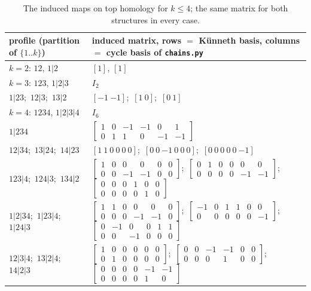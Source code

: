 \documentclass[11pt]{amsart}
\theoremstyle{definition}
\theoremstyle{remark}
\begin{document}
\begin{table}[h]
\centering\footnotesize
\begin{tabular}{@{}ll@{}}
\toprule
profile (partition of $\{1..k\}$) & induced matrix, rows $=$ K\"unneth basis, columns $=$ cycle basis of \texttt{chains.py}\\
\midrule
$k=2$: $12$, $1|2$ & $[1]$, $[1]$\\
$k=3$: $123$, $1|2|3$ & $I_2$\\
\quad $1|23$;\ $12|3$;\ $13|2$ & $[-1\ {-1}]$;\ $[1\ 0]$;\ $[0\ 1]$\\
$k=4$: $1234$, $1|2|3|4$ & $I_6$\\
\quad $1|234$ & $\begin{bmatrix}1&0&-1&-1&0&1\\0&1&1&0&-1&-1\end{bmatrix}$\\
\quad $12|34$;\ $13|24$;\ $14|23$ & $[1\ 1\ 0\ 0\ 0\ 0]$;\ $[0\ 0\ {-1}\ 0\ 0\ 0]$;\ $[0\ 0\ 0\ 0\ 0\ {-1}]$\\
\quad $123|4$;\ $124|3$;\ $134|2$ & $\begin{bmatrix}1&0&0&0&0&0\\0&0&-1&-1&0&0\end{bmatrix}$;\ $\begin{bmatrix}0&1&0&0&0&0\\0&0&0&0&-1&-1\end{bmatrix}$;\ $\begin{bmatrix}0&0&0&1&0&0\\0&0&0&0&1&0\end{bmatrix}$\\
\quad $1|2|34$;\ $1|23|4$;\ $1|24|3$ & $\begin{bmatrix}1&1&0&0&0&0\\0&0&0&-1&-1&0\end{bmatrix}$;\ $\begin{bmatrix}-1&0&1&1&0&0\\0&0&0&0&0&-1\end{bmatrix}$;\ $\begin{bmatrix}0&-1&0&0&1&1\\0&0&-1&0&0&0\end{bmatrix}$\\
\quad $12|3|4$;\ $13|2|4$;\ $14|2|3$ & $\begin{bmatrix}1&0&0&0&0&0\\0&1&0&0&0&0\end{bmatrix}$;\ $\begin{bmatrix}0&0&-1&-1&0&0\\0&0&0&1&0&0\end{bmatrix}$;\ $\begin{bmatrix}0&0&0&0&-1&-1\\0&0&0&0&1&0\end{bmatrix}$\\
\bottomrule
\end{tabular}
\caption{The induced maps on top homology for $k\leq4$; the same matrix for both structures in every case.}\label{tab:mat}
\end{table}
\end{document}
